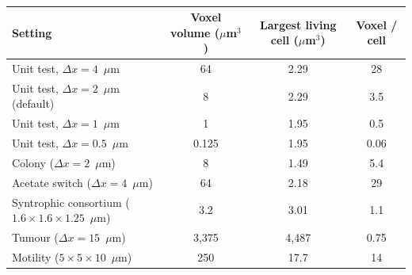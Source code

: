 \begin{table}[!htbp]
\chcolor
\centering
\caption{}
\label{tab:ut_voxel_cell}
\small
\begin{tabular}{p{6.2cm}ccc}
\toprule
Setting & Voxel volume ($\mu$m$^3$) & Largest living cell ($\mu$m$^3$) & Voxel / cell\\
\midrule
Unit test, $\Delta x = 4$~$\mu$m & 64 & 2.29 & 28\\
Unit test, $\Delta x = 2$~$\mu$m (default) & 8 & 2.29 & 3.5\\
Unit test, $\Delta x = 1$~$\mu$m & 1 & 1.95 & 0.5\\
Unit test, $\Delta x = 0.5$~$\mu$m & 0.125 & 1.95 & 0.06\\
Colony ($\Delta x = 2$~$\mu$m) & 8 & 1.49 & 5.4\\
Acetate switch ($\Delta x = 4$~$\mu$m) & 64 & 2.18 & 29\\
Syntrophic consortium ($1.6 \times 1.6 \times 1.25$~$\mu$m) & 3.2 & 3.01 & 1.1\\
Tumour ($\Delta x = 15$~$\mu$m) & 3,375 & 4,487 & 0.75\\
Motility ($5 \times 5 \times 10$~$\mu$m) & 250 & 17.7 & 14\\
\bottomrule
\end{tabular}
\end{table}

